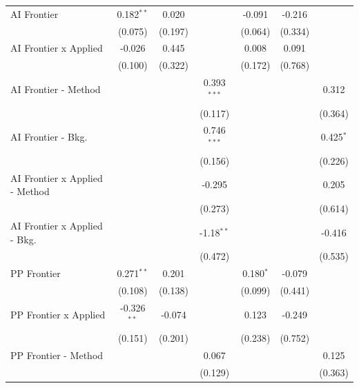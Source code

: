 \begin{tabular}{lcccccc}
   AI Frontier                    & 0.182$^{**}$  & 0.020   &               & -0.091      & -0.216  &   \\   
                                  & (0.075)       & (0.197) &               & (0.064)     & (0.334) &   \\   
   AI Frontier x Applied          & -0.026        & 0.445   &               & 0.008       & 0.091   &   \\   
                                  & (0.100)       & (0.322) &               & (0.172)     & (0.768) &   \\   
   AI Frontier - Method           &               &         & 0.393$^{***}$ &             &         & 0.312\\   
                                  &               &         & (0.117)       &             &         & (0.364)\\   
   AI Frontier - Bkg.             &               &         & 0.746$^{***}$ &             &         & 0.425$^{*}$\\   
                                  &               &         & (0.156)       &             &         & (0.226)\\   
   AI Frontier x Applied - Method &               &         & -0.295        &             &         & 0.205\\   
                                  &               &         & (0.273)       &             &         & (0.614)\\   
   AI Frontier x Applied - Bkg.   &               &         & -1.18$^{**}$  &             &         & -0.416\\   
                                  &               &         & (0.472)       &             &         & (0.535)\\   
   PP Frontier                    & 0.271$^{**}$  & 0.201   &               & 0.180$^{*}$ & -0.079  &   \\   
                                  & (0.108)       & (0.138) &               & (0.099)     & (0.441) &   \\   
   PP Frontier x Applied          & -0.326$^{**}$ & -0.074  &               & 0.123       & -0.249  &   \\   
                                  & (0.151)       & (0.201) &               & (0.238)     & (0.752) &   \\   
   PP Frontier - Method           &               &         & 0.067         &             &         & 0.125\\   
                                  &               &         & (0.129)       &             &         & (0.363)\\   

\end{tabular}

